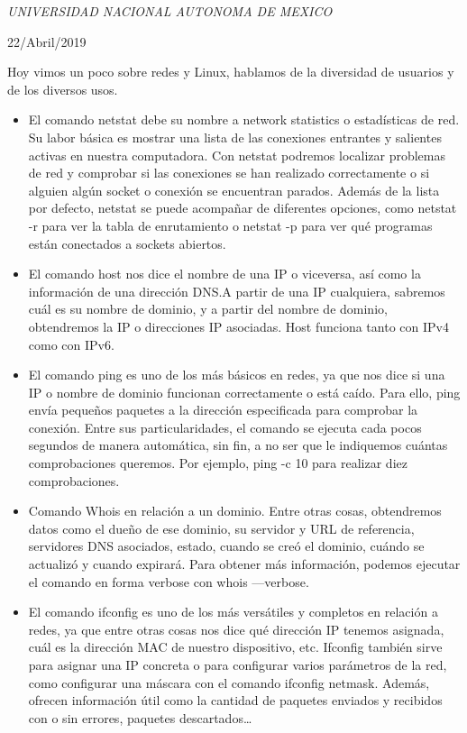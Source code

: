 \documentclass[a4paper, 11pt, oneside]{article}
\begin{document}
\begin{titlepage}
	\textit{UNIVERSIDAD NACIONAL AUTONOMA DE MEXICO} 
	
	\vfill
	
	
	
	
	\vspace{0.3\baselineskip} 
	
	22/Abril/2019 
	
	 

\end{titlepage}
Hoy vimos un poco sobre redes y Linux, hablamos de la diversidad de usuarios y de los diversos usos.
\begin{itemize}
    \item El comando netstat debe su nombre a network statistics o estadísticas de red. Su labor básica es mostrar una lista de las conexiones entrantes y salientes activas en nuestra computadora. Con netstat podremos localizar problemas de red y comprobar si las conexiones se han realizado correctamente o si alguien algún socket o conexión se encuentran parados. Además de la lista por defecto, netstat se puede acompañar de diferentes opciones, como netstat -r para ver la tabla de enrutamiento o netstat -p para ver qué programas están conectados a sockets abiertos.
    \item El comando host nos dice el nombre de una IP o viceversa, así como la información de una dirección DNS.A partir de una IP cualquiera, sabremos cuál es su nombre de dominio, y a partir del nombre de dominio, obtendremos la IP o direcciones IP asociadas. Host funciona tanto con IPv4 como con IPv6.

    \item El comando ping es uno de los más básicos en redes, ya que nos dice si una IP o nombre de dominio funcionan correctamente o está caído. Para ello, ping envía pequeños paquetes a la dirección especificada para comprobar la conexión. Entre sus particularidades, el comando se ejecuta cada pocos segundos de manera automática, sin fin, a no ser que le indiquemos cuántas comprobaciones queremos. Por ejemplo, ping -c 10 para realizar diez comprobaciones.

    \item  Comando Whois en relación a un dominio. Entre otras cosas, obtendremos datos como el dueño de ese dominio, su servidor y URL de referencia, servidores DNS asociados, estado, cuando se creó el dominio, cuándo se actualizó y cuando expirará. Para obtener más información, podemos ejecutar el comando en forma verbose con whois —verbose.

    \item El comando ifconfig es uno de los más versátiles y completos en relación a redes, ya que entre otras cosas nos dice qué dirección IP tenemos asignada, cuál es la dirección MAC de nuestro dispositivo, etc. Ifconfig también sirve para asignar una IP concreta o para configurar varios parámetros de la red, como configurar una máscara con el comando ifconfig netmask. Además, ofrecen información útil como la cantidad de paquetes enviados y recibidos con o sin errores, paquetes descartados…
\end{itemize}
\end{document}
